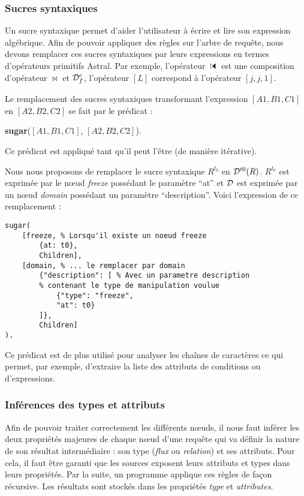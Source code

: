 \subsubsection{Sucres syntaxiques}
Un sucre syntaxique permet d'aider l'utilisateur à écrire et lire son expression algébrique. Afin de pouvoir appliquer des règles sur l'arbre de requête, nous devons remplacer ces sucres syntaxiques par leurs expressions en termes d'opérateurs primitifs Astral. Par exemple, l'opérateur $\ssjoin$ est une composition d'opérateur $\Join$ et $\mathcal{D}_f^c$, l'opérateur $[L]$ correspond à l'opérateur $[j,j,1]$.

\begin{regle}
Le remplacement des sucres syntaxiques transformant l'expression $[A1,B1,C1]$ en $[A2,B2,C2]$ se fait par le prédicat :
\begin{center} \textbf{sugar}($[A1,B1,C1]$, $[A2,B2,C2]$).\end{center}
Ce prédicat est appliqué tant qu'il peut l'être (de manière itérative).
\end{regle}

\begin{example}
	Nous nous proposons de remplacer le sucre syntaxique $R^{t_0}$ en $\mathcal{D}^{t0} (R)$. $R^{t_0}$ est exprimée par le nœud \textit{freeze} possédant le paramètre \enquote{at} et $\mathcal{D}$ est exprimée par un nœud \textit{domain} possédant un paramètre \enquote{description}. Voici l'expression de ce remplacement :
	\begin{lstlisting}
sugar(
	[freeze, % Lorsqu'il existe un noeud freeze
		{at: t0},
		Children], 
	[domain, % ... le remplacer par domain
		{"description": [ % Avec un parametre description
		% contenant le type de manipulation voulue
			{"type": "freeze", 
			"at": t0}
		]},
		Children]
).
	\end{lstlisting}
\end{example}

Ce prédicat est de plus utilisé pour analyser les chaînes de caractères ce qui permet, par exemple, d'extraire la liste des attributs de conditions ou d'expressions.

\subsubsection{Inférences des types et attributs}
Afin de pouvoir traiter correctement les différents nœuds, il nous faut inférer les deux propriétés majeures de chaque nœud d'une requête qui va définir la nature de son résultat intermédiaire : son type (\textit{flux} ou \textit{relation}) et ses attributs. Pour cela, il faut être garanti que les sources exposent leurs attributs et types dans leurs propriétés. Par la suite, un programme applique ces règles de façon récursive. Les résultats sont stockés dans les propriétés \textit{type} et \textit{attributes}.

